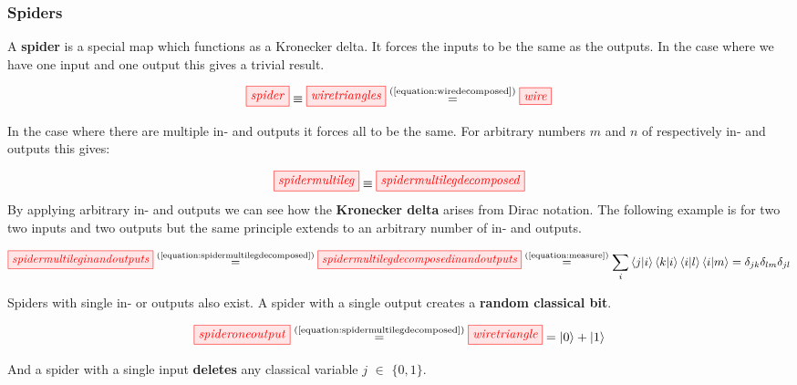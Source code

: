 \documentclass[]{article}
\newcommand{\equaltext}[1]{\ensuremath{\stackrel{\text{#1}}{=}}}
\begin{document}
\subsubsection{Spiders}
\label{spiders}

A \textbf{spider} is a special map which functions as a Kronecker delta. It forces the inputs to be the same as the outputs. In the case where we have one input and one output this gives a trivial result.

\begin{equation}
\label{equation:boringspider}
\tikzfig{spider} \equiv \tikzfig{wiretriangles} \equaltext{(\ref{equation:wiredecomposed})} \tikzfig{wire}
\end{equation}

In the case where there are multiple in- and outputs it forces all to be the same. For arbitrary numbers $m$ and $n$ of respectively in- and outputs this gives:

\begin{equation}
\label{equation:spidermultilegdecomposed}
\tikzfig{spidermultileg} \equiv \tikzfig{spidermultilegdecomposed}
\end{equation}
\newpage
By applying arbitrary in- and outputs we can see how the \textbf{Kronecker delta} arises from Dirac notation. The following example is for two two inputs and two outputs but the same principle extends to an arbitrary number of in- and outputs.

\begin{equation}
\begin{split}
\tikzfig{spidermultileginandoutputs} \equaltext{(\ref{equation:spidermultilegdecomposed})} \tikzfig{spidermultilegdecomposedinandoutputs} \equaltext{(\ref{equation:measure})} \sum_{i} \bra{j}\ket{i}\bra{k}\ket{i}\bra{i}\ket{l}\bra{i}\ket{m} = \delta_{jk} \delta_{lm}  \delta_{jl}
\end{split}
\end{equation}

Spiders with single in- or outputs also exist. A spider with a single output creates a 
\textbf{random classical bit}.

\begin{equation}
\label{equation:spideroneoutput}
\tikzfig{spideroneoutput} \equaltext{(\ref{equation:spidermultilegdecomposed})} \tikzfig{wiretriangle} = \ket{0} + \ket{1}
\end{equation}

And a spider with a single input \textbf{deletes} any classical variable $j$ $\in$ $\{0,1\}$.
\end{document}
